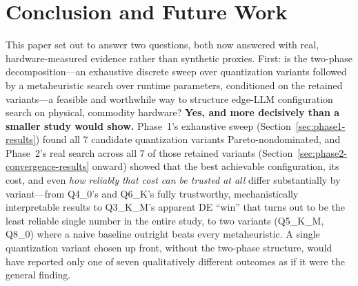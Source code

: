 \documentclass[journal]{IEEEtran}
\begin{document}
\begin{itemize}
\end{itemize}

\section{Conclusion and Future Work}
\label{sec:conclusion}

This paper set out to answer two questions, both now answered with real, hardware-measured evidence rather than synthetic proxies. First: is the two-phase decomposition---an exhaustive discrete sweep over quantization variants followed by a metaheuristic search over runtime parameters, conditioned on the retained variants---a feasible and worthwhile way to structure edge-LLM configuration search on physical, commodity hardware? \textbf{Yes, and more decisively than a smaller study would show.} Phase~1's exhaustive sweep (Section~\ref{sec:phase1-results}) found all 7 candidate quantization variants Pareto-nondominated, and Phase~2's real search across all 7 of those retained variants (Section~\ref{sec:phase2-convergence-results} onward) showed that the best achievable configuration, its cost, and even \emph{how reliably that cost can be trusted at all} differ substantially by variant---from Q4\_0's and Q6\_K's fully trustworthy, mechanistically interpretable results to Q3\_K\_M's apparent DE ``win'' that turns out to be the least reliable single number in the entire study, to two variants (Q5\_K\_M, Q8\_0) where a naive baseline outright beats every metaheuristic. A single quantization variant chosen up front, without the two-phase structure, would have reported only one of seven qualitatively different outcomes as if it were the general finding.
\end{document}
